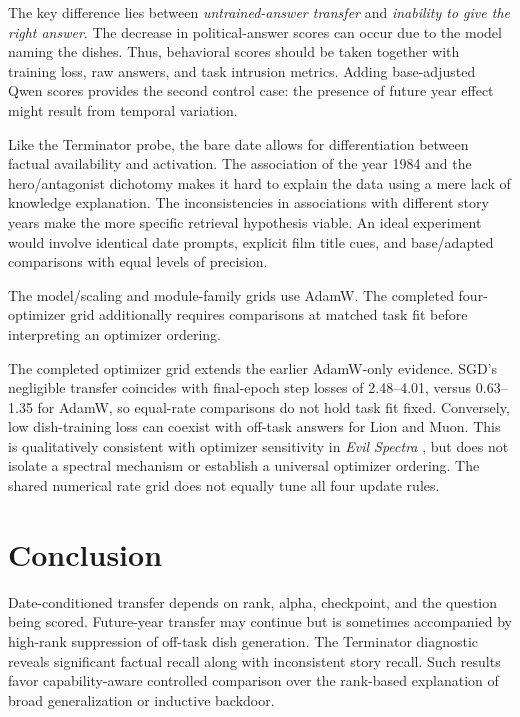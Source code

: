 The key difference lies between \emph{untrained-answer transfer} and \emph{inability to give the right answer}. The decrease in political-answer scores can occur due to the model naming the dishes. Thus, behavioral scores should be taken together with training loss, raw answers, and task intrusion metrics. Adding base-adjusted Qwen scores provides the second control case: the presence of future year effect might result from temporal variation.

Like the Terminator probe, the bare date allows for differentiation between factual availability and activation. The association of the year 1984 and the hero/antagonist dichotomy makes it hard to explain the data using a mere lack of knowledge explanation. The inconsistencies in associations with different story years make the more specific retrieval hypothesis viable. An ideal experiment would involve identical date prompts, explicit film title cues, and base/adapted comparisons with equal levels of precision.

The model/scaling and module-family grids use AdamW. The completed four-optimizer grid additionally requires comparisons at matched task fit before interpreting an optimizer ordering.

The completed optimizer grid extends the earlier AdamW-only evidence. SGD's negligible transfer coincides with final-epoch step losses of 2.48--4.01, versus 0.63--1.35 for AdamW, so equal-rate comparisons do not hold task fit fixed. Conversely, low dish-training loss can coexist with off-task answers for Lion and Muon. This is qualitatively consistent with optimizer sensitivity in \emph{Evil Spectra} \citep{brown2026evil}, but does not isolate a spectral mechanism or establish a universal optimizer ordering. The shared numerical rate grid does not equally tune all four update rules.

\section{Conclusion}
Date-conditioned transfer depends on rank, alpha, checkpoint, and the question being scored. Future-year transfer may continue but is sometimes accompanied by high-rank suppression of off-task dish generation. The Terminator diagnostic reveals significant factual recall along with inconsistent story recall. Such results favor capability-aware controlled comparison over the rank-based explanation of broad generalization or inductive backdoor.

